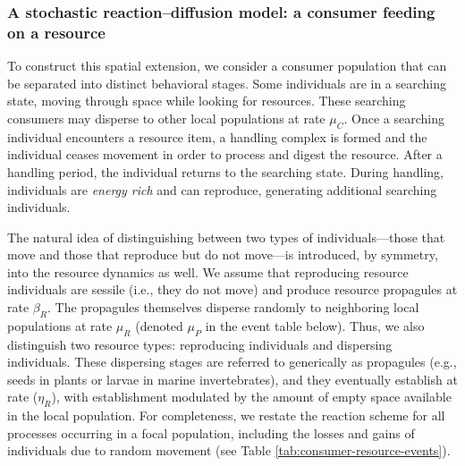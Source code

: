 \subsubsection*{A stochastic reaction--diffusion model: a consumer feeding on a resource}
To construct this spatial extension, we consider a consumer population that can be separated into distinct behavioral stages. Some individuals are in a searching state, moving through space while looking for resources. These searching consumers may disperse to other local populations at rate $\mu_C$. Once a searching individual encounters a resource item, a handling complex is formed and the individual ceases movement in order to process and digest the resource. After a handling period, the individual returns to the searching state. During handling, individuals are {\em energy rich} and can reproduce, generating additional searching individuals. 

The natural idea of distinguishing between two types of individuals—those that move and those that reproduce but do not move—is introduced, by symmetry, into the resource dynamics as well. We assume that reproducing resource individuals are sessile (i.e., they do not move) and produce resource propagules at rate $\beta_R$. The propagules themselves disperse randomly to neighboring local populations at rate $\mu_R$ (denoted $\mu_P$ in the event table below). Thus, we also distinguish two resource types: reproducing individuals and dispersing individuals. These dispersing stages are referred to generically as propagules (e.g., seeds in plants or larvae in marine invertebrates), and they eventually establish at rate ($\eta_R$), with establishment modulated by the amount of empty space available in the local population. For completeness, we restate the reaction scheme for all processes occurring in a focal population, including the losses and gains of individuals due to random movement (see Table \ref{tab:consumer-resource-events}).

